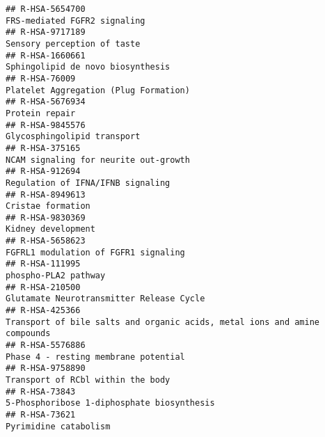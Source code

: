 \documentclass[
]{article}
\begin{document}
\begin{verbatim}
## R-HSA-5654700                                                                                                         FRS-mediated FGFR2 signaling
## R-HSA-9717189                                                                                                          Sensory perception of taste
## R-HSA-1660661                                                                                                    Sphingolipid de novo biosynthesis
## R-HSA-76009                                                                                                  Platelet Aggregation (Plug Formation)
## R-HSA-5676934                                                                                                                       Protein repair
## R-HSA-9845576                                                                                                          Glycosphingolipid transport
## R-HSA-375165                                                                                                 NCAM signaling for neurite out-growth
## R-HSA-912694                                                                                                     Regulation of IFNA/IFNB signaling
## R-HSA-8949613                                                                                                                    Cristae formation
## R-HSA-9830369                                                                                                                   Kidney development
## R-HSA-5658623                                                                                                 FGFRL1 modulation of FGFR1 signaling
## R-HSA-111995                                                                                                                  phospho-PLA2 pathway
## R-HSA-210500                                                                                              Glutamate Neurotransmitter Release Cycle
## R-HSA-425366                                                             Transport of bile salts and organic acids, metal ions and amine compounds
## R-HSA-5576886                                                                                                 Phase 4 - resting membrane potential
## R-HSA-9758890                                                                                                    Transport of RCbl within the body
## R-HSA-73843                                                                                             5-Phosphoribose 1-diphosphate biosynthesis
## R-HSA-73621                                                                                                                  Pyrimidine catabolism

\end{verbatim}
\end{document}
